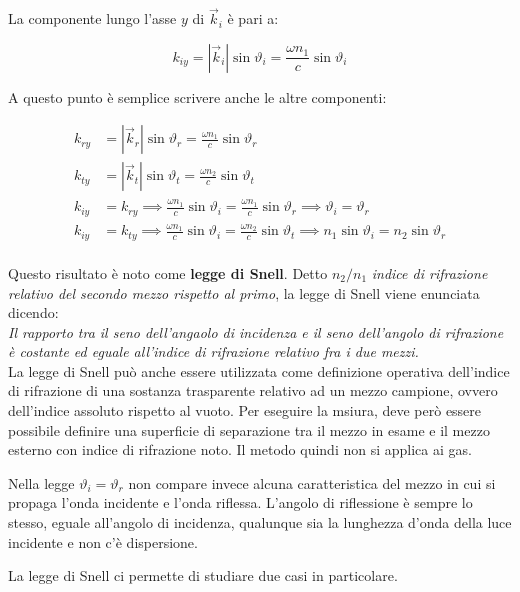 La componente lungo l'asse $y$ di $\vec{k}_i$ è pari a:

\[
	k_{iy} = |\vec{k}_i |\sin \vartheta_i = \frac{\omega n_1}{c}\sin \vartheta_i
\]

A questo punto è semplice scrivere anche le altre componenti:

\begin{align*}
	k_{ry} &= |\vec{k}_r |\sin \vartheta_r = \frac{\omega n_1}{c}\sin \vartheta_r \\
	k_{ty} &= |\vec{k}_t |\sin \vartheta_t = \frac{\omega n_2}{c}\sin \vartheta_t \\
	k_{iy}&=k_{ry} \implies \frac{\omega n_1}{c}\sin \vartheta_i = \frac{\omega n_1}{c}\sin \vartheta_r \implies \boxed{\vartheta_i=\vartheta_r}\\
	k_{iy}&=k_{ty} \implies \frac{\omega n_1}{c}\sin \vartheta_i = \frac{\omega n_2}{c}\sin \vartheta_t \implies \boxed{n_1\sin  \vartheta_i=n_2\sin  \vartheta_r}\\
\end{align*}

Questo risultato è noto come \textbf{legge di Snell}.
Detto $n_2/n_1$ \emph{indice di rifrazione relativo del secondo mezzo rispetto al primo}, la legge di Snell viene enunciata dicendo:\\
\emph{Il rapporto tra il seno dell'angaolo di incidenza e il seno dell'angolo di rifrazione è costante ed eguale all'indice di rifrazione relativo fra i due mezzi.}\\
La legge di Snell può anche essere utilizzata come definizione operativa dell'indice di rifrazione di una sostanza trasparente relativo ad un mezzo campione, ovvero dell'indice assoluto rispetto al vuoto. Per eseguire la msiura, deve però essere possibile definire una superficie di separazione tra il mezzo in esame e il mezzo esterno con indice di rifrazione noto. Il metodo quindi non si applica ai gas.

Nella legge $\vartheta_i=\vartheta_r  $ non compare invece alcuna caratteristica del mezzo in cui si propaga l'onda incidente e l'onda riflessa. L'angolo di riflessione è sempre lo stesso, eguale all'angolo di incidenza, qualunque sia la lunghezza d'onda della luce incidente e non c'è dispersione.

La legge di Snell ci permette di studiare due casi in particolare.

